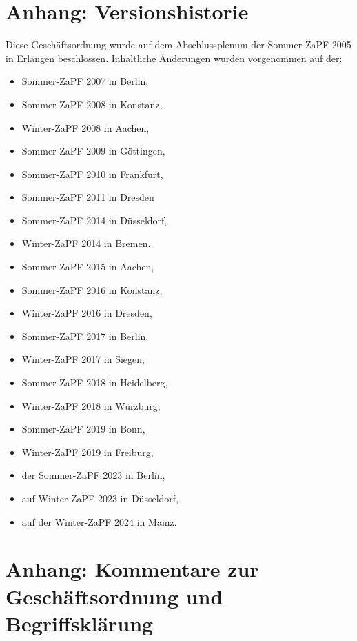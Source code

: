 \documentclass[
  a4paper,
  oneside]{scrartcl}
\providecommand{\tightlist}{%
  \setlength{\itemsep}{0pt}\setlength{\parskip}{0pt}}
\begin{document}
\section*{Anhang: Versionshistorie}\label{anhang-versionshistorie}

Diese Geschäftsordnung wurde auf dem Abschlussplenum der Sommer-ZaPF
2005 in Erlangen beschlossen. Inhaltliche Änderungen wurden vorgenommen
auf der:

\begin{itemize}
\tightlist
\item
  Sommer-ZaPF 2007 in Berlin,
\item
  Sommer-ZaPF 2008 in Konstanz,
\item
  Winter-ZaPF 2008 in Aachen,
\item
  Sommer-ZaPF 2009 in Göttingen,
\item
  Sommer-ZaPF 2010 in Frankfurt,
\item
  Sommer-ZaPF 2011 in Dresden
\item
  Sommer-ZaPF 2014 in Düsseldorf,
\item
  Winter-ZaPF 2014 in Bremen.
\item
  Sommer-ZaPF 2015 in Aachen,
\item
  Sommer-ZaPF 2016 in Konstanz,
\item
  Winter-ZaPF 2016 in Dresden,
\item
  Sommer-ZaPF 2017 in Berlin,
\item
  Winter-ZaPF 2017 in Siegen,
\item
  Sommer-ZaPF 2018 in Heidelberg,
\item
  Winter-ZaPF 2018 in Würzburg,
\item
  Sommer-ZaPF 2019 in Bonn,
\item
  Winter-ZaPF 2019 in Freiburg,
\item
  der Sommer-ZaPF 2023 in Berlin,
\item
  auf Winter-ZaPF 2023 in Düsseldorf,
\item
  auf der Winter-ZaPF 2024 in Mainz.
\end{itemize}

\section*{Anhang: Kommentare zur Geschäftsordnung und
Begriffsklärung}\label{anhang-kommentare-zur-geschuxe4ftsordnung-und-begriffskluxe4rung}
\end{document}
